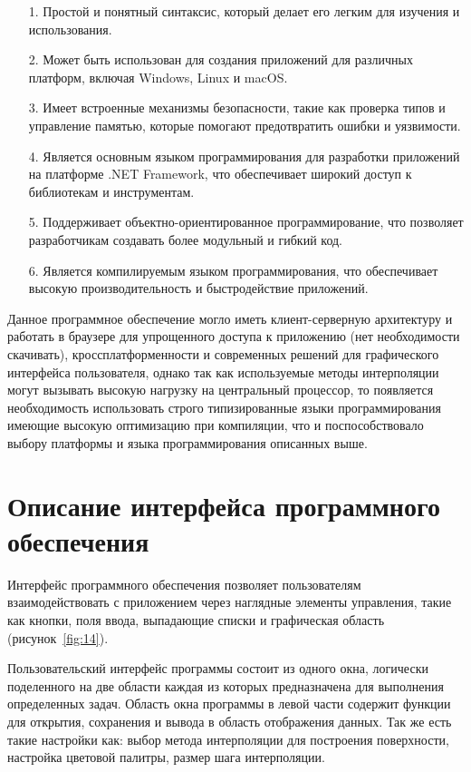 \begin{enumerate} 
  \item[1.] Простой и понятный синтаксис, который делает его легким для изучения и использования.
  \item[2.] Может быть использован для создания приложений для различных платформ, включая Windows, Linux и macOS.
  \item[3.] Имеет встроенные механизмы безопасности, такие как проверка типов и управление памятью, которые помогают предотвратить ошибки и уязвимости.
  \item[4.] Является основным языком программирования для разработки приложений на платформе .NET Framework, что обеспечивает широкий доступ к библиотекам и инструментам.
  \item[5.] Поддерживает объектно-ориентированное программирование, что позволяет разработчикам создавать более модульный и гибкий код.
  \item[6.] Является компилируемым языком программирования, что обеспечивает высокую производительность и быстродействие приложений.
\end{enumerate} 


Данное программное обеспечение могло иметь клиент-серверную архитектуру и работать в браузере для   упрощенного доступа к приложению (нет необходимости скачивать), кроссплатформенности и современных решений для графического интерфейса пользователя, однако так как используемые методы интерполяции могут вызывать высокую нагрузку на центральный процессор, то появляется необходимость использовать строго типизированные языки программирования имеющие высокую оптимизацию при компиляции, что и поспособствовало выбору платформы и языка программирования описанных выше. 

\section{Описание интерфейса программного обеспечения}

Интерфейс программного обеспечения позволяет пользователям взаимодействовать с приложением через наглядные элементы управления, такие как кнопки, поля ввода, выпадающие списки и графическая область (рисунок~\ref{fig:14}).

Пользовательский интерфейс программы состоит из одного окна, логически поделенного на две области каждая из которых предназначена для выполнения определенных задач. Область окна программы в левой части содержит функции для открытия, сохранения и вывода в область отображения данных. Так же есть такие настройки как: выбор метода интерполяции для построения поверхности, настройка цветовой палитры, размер шага интерполяции.

